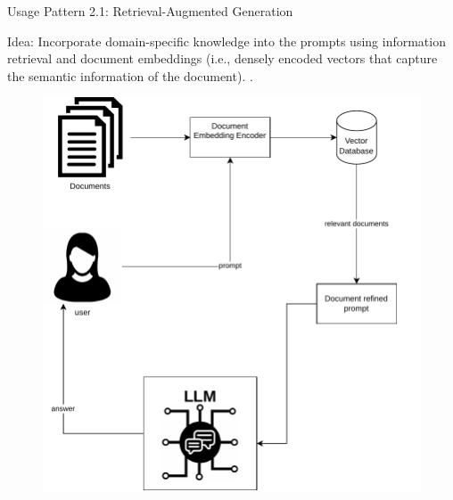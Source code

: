 \documentclass[handout]{beamer}
\begin{document}
\begin{frame}{Usage Pattern 2.1: Retrieval-Augmented Generation}
\begin{scriptsize}
Idea: Incorporate domain-specific knowledge into the prompts using information retrieval and document embeddings (i.e., densely encoded vectors that capture the semantic information of the document). \cite{lewis2021retrievalaugmented}.

\end{scriptsize}

    \begin{figure}[h]
        	\includegraphics[scale = 0.4]{pics/retrievalaugmented.pdf}
        \end{figure}  


\end{frame}
\end{document}
